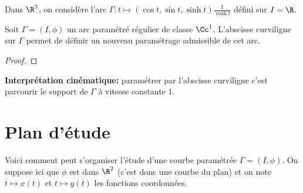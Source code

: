 \begin{exemple}
	Dans $\R^3$, on considère l'arc $\Gamma: t \mapsto \left( \cos t, \sin t , \sinh t \right) \frac{1}{\cosh t}$ défini sur $I=\R$.
 \pl{\rep{10cm}}
\end{exemple}

\begin{proposition}
	Soit $\Gamma=(I,\phi)$ un arc paramétré régulier de classe $\Cc^1$. L'abscisse curviligne sur $\Gamma$ permet de définir un nouveau paramétrage admissible de cet arc.
\end{proposition}

\begin{proof}
 \pl{\rep{6cm}}	
\end{proof}

{\bf \sffamily Interprétation cinématique:}  paramétrer par l'abscisse curviligne c'est parcourir le support de $\Gamma$ à vitesse constante 1.

\section{Plan d'étude}
Voici comment peut s'organiser l'étude d'une courbe paramétrée $\Gamma=(I,\phi)$. On suppose ici que $\phi$ est dans $\R^2$ (c'est donc une courbe du plan) et on note $t\mapsto x(t)$ et $t\mapsto y(t)$ les fonctions coordonnées.

